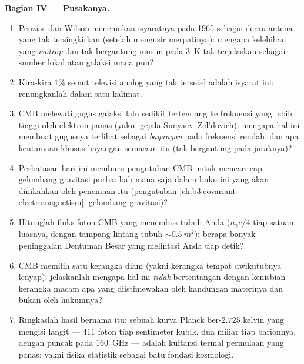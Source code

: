 \begin{problem}
\medskip\noindent\textbf{Bagian IV --- Pusakanya.}
\begin{enumerate}[resume]
  \item Penzias dan Wilson menemukan isyaratnya pada 1965 sebagai derau
        antena yang tak tersingkirkan (setelah mengusir merpatinya):
        mengapa kelebihan yang \emph{isotrop} dan tak bergantung musim
        pada \qty{3}{K} tak terjelaskan sebagai sumber lokal atau galaksi
        mana pun?
  \item Kira-kira $1\%$ semut televisi analog yang tak tersetel adalah
        isyarat ini: renungkanlah dalam satu kalimat.
  \item CMB melewati gugus galaksi lalu sedikit tertendang ke frekuensi
        yang lebih tinggi oleh elektron panas (yakni gejala
        Sunyaev--Zel'dovich): mengapa hal ini membuat gugusnya terlihat
        sebagai \emph{bayangan} pada frekuensi rendah, dan apa keutamaan
        khusus bayangan semacam itu (tak bergantung pada
        jaraknya)?
  \item Perbatasan hari ini memburu pengutuban CMB untuk mencari cap
        gelombang gravitasi purba: bab mana saja dalam buku ini yang
        akan dinikahkan oleh penemuan itu
        (pengutuban \cref{ch:b3:covariant-electromagnetism},
        gelombang gravitasi)?
  \item Hitunglah fluks foton CMB yang menembus tubuh Anda
        ($n_\gamma c/4$ tiap satuan luasnya, dengan tampang lintang
        tubuh $\sim\qty{0.5}{m^2}$): berapa banyak peninggalan Dentuman
        Besar yang melintasi Anda tiap detik?
  \item CMB memilih satu kerangka diam (yakni kerangka tempat
        dwikutubnya lenyap): jelaskanlah mengapa hal ini \emph{tidak}
        bertentangan dengan kenisbian --- kerangka macam apa yang
        diistimewakan oleh kandungan materinya dan bukan oleh hukumnya?
  \item Ringkaslah hasil bernama itu: sebuah kurva Planck ber-$2.725$
        kelvin yang mengisi langit --- $411$ foton tiap sentimeter
        kubik, dua miliar tiap barionnya, dengan puncak pada
        \qty{160}{GHz} --- adalah kuitansi termal permulaan yang
        panas: yakni fisika statistik sebagai batu fondasi
        kosmologi.
\end{enumerate}
\end{problem}
